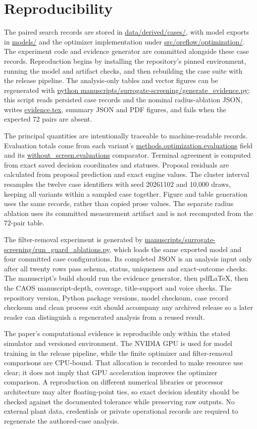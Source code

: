 \documentclass[10pt]{article}
\begin{document}
\section{Reproducibility}
The paired search records are stored in \url{data/derived/cases/}, with model exports in \url{models/} and the optimizer implementation under \url{src/oreflow/optimization/}. The experiment code and evidence generator are committed alongside these case records. Reproduction begins by installing the repository's pinned environment, running the model and artifact checks, and then rebuilding the case suite with the release pipeline. The analysis-only tables and vector figures can be regenerated with \url{python manuscripts/surrogate-screening/generate_evidence.py}; this script reads persisted case records and the nominal radius-ablation JSON, writes \url{evidence.tex}, summary JSON and PDF figures, and fails when the expected 72 pairs are absent.

The principal quantities are intentionally traceable to machine-readable records. Evaluation totals come from each variant's \url{methods.optimization.evaluations} field and its \url{without_screen.evaluations} comparator. Terminal agreement is computed from exact saved decision coordinates and statuses. Proposal residuals are calculated from proposal prediction and exact engine values. The cluster interval resamples the twelve case identifiers with seed 20261102 and 10,000 draws, keeping all variants within a sampled case together. Figure and table generation uses the same records, rather than copied prose values. The separate radius ablation uses its committed measurement artifact and is not recomputed from the 72-pair table.

The filter-removal experiment is generated by \url{manuscripts/surrogate-screening/run_guard_ablations.py}, which loads the same exported model and four committed case configurations. Its completed JSON is an analysis input only after all twenty rows pass schema, status, uniqueness and exact-outcome checks. The manuscript's build should run the evidence generator, then pdfLaTeX, then the CAOS manuscript-depth, coverage, title-support and voice checks. The repository version, Python package versions, model checksum, case record checksum and clean process exit should accompany any archived release so a later reader can distinguish a regenerated analysis from a reused result.

The paper's computational evidence is reproducible only within the stated simulator and versioned environment. The NVIDIA GPU is used for model training in the release pipeline, while the finite optimizer and filter-removal comparisons are CPU-bound. That allocation is recorded to make resource use clear; it does not imply that GPU acceleration improves the optimizer comparison. A reproduction on different numerical libraries or processor architecture may alter floating-point ties, so exact decision identity should be checked against the documented tolerance while preserving raw outputs. No external plant data, credentials or private operational records are required to regenerate the authored-case analysis.
\end{document}
